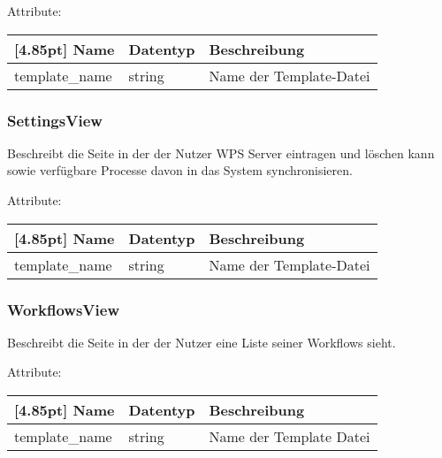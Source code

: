 		Attribute:
		\begin{center}
			\renewcommand{\arraystretch}{1.5}
			\setlength\tabcolsep{5pt}
			\begin{tabularx}{\textwidth}{|l|l|X|}
				\hline
				\rowcolor[gray]{0.75}[4.85pt]					
				Name & Datentyp & Beschreibung \\ \hline
				template_name & string & Name der Template-Datei \\ \hline		
			\end{tabularx}
		\end{center}
		
		\subsubsection{SettingsView}
		
		Beschreibt die Seite in der der Nutzer WPS Server eintragen und löschen kann sowie verfügbare Processe davon in das System synchronisieren.\newline
		
		Attribute:
		\begin{center}
			\renewcommand{\arraystretch}{1.5}
			\setlength\tabcolsep{5pt}
			\begin{tabularx}{\textwidth}{|l|l|X|}
				\hline
				\rowcolor[gray]{0.75}[4.85pt]					
				Name & Datentyp & Beschreibung \\ \hline
				template_name & string & Name der Template-Datei \\ \hline		
			\end{tabularx}
		\end{center}

		\subsubsection{WorkflowsView}
		
		Beschreibt die Seite in der der Nutzer eine Liste seiner Workflows sieht.\newline

		Attribute:
		\begin{center}
			\renewcommand{\arraystretch}{1.5}
			\setlength\tabcolsep{5pt}
			\begin{tabularx}{\textwidth}{|l|l|X|}
				\hline
				\rowcolor[gray]{0.75}[4.85pt]					
				Name & Datentyp & Beschreibung \\ \hline
				template\_name & string & Name der Template Datei \\ \hline				
			\end{tabularx}
		\end{center}
		
